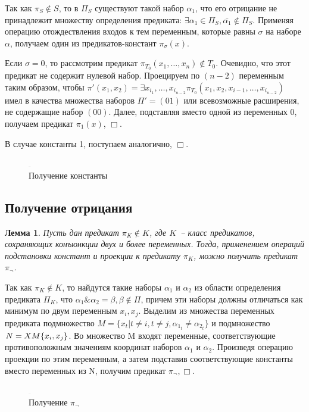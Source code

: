 \documentclass[12pt]{article}
\newtheorem{lemma}[theorem]{Лемма}
\newenvironment{proof}[1][Доказательство]{\begin{trivlist}
\item[\hskip \labelsep {\bfseries #1}]}{\end{trivlist}}
\begin{document}
\begin{proof}
Так как $\pi_S \notin S$, то в $\Pi_S$ существуют такой набор
$\alpha_1$, что его отрицание не принадлежит множеству определения предиката:
$\exists \alpha_1 \in \Pi_S, \bar{\alpha_1} \notin \Pi_S$.
Применяя операцию отождествления входов к тем переменным, которые равны $\sigma$ на наборе $\alpha$,
получаем один из предикатов-констант $\pi_{\sigma}(x)$.

Если $\sigma = 0$, то рассмотрим предикат 
$\pi_{T_0}(x_1, \dots, x_n) \notin T_0$. Очевидно, что этот предикат не содержит нулевой набор. 
Проецируем по $(n-2)$ переменным таким образом, чтобы 
$\pi'(x_1, x_2) = \exists {x_{i_1}, \dots, x_{i_{n-2}}} \pi_{T_0}(x_1, x_2, x_{i-1}, \dots, x_{i_{n-2}})$
имел в качества множества наборов $\Pi' = { (01) }$ или всевозможные расширения, не содержащие набор $(00)$.
Далее, подставляя вместо одной из переменных 0, получаем предикат $\pi_1(x)$, $\Box$. 

В случае константы 1, поступаем аналогично, $\Box$.
\end{proof}
\begin{figure}[htb]
\centering
\includegraphics[width=0.01\textwidth]{3_2to3.png}
\caption{Получение константы}
\label{fig:constant}
\end{figure}

\subsection{Получение отрицания}
\begin{lemma}
\label{eq:negate}
Пусть дан предикат $\pi_K \notin K$, где $K$~-- класс предикатов, сохраняющих конъюнкции двух и более переменных.
Тогда, применением операций подстановки констант и проекции
к предикату $\pi_K$, можно получить предикат $\pi_{\neg}$.
\end{lemma}

\begin{proof}
Так как $\pi_K \notin K$, то найдутся такие наборы $\alpha_1$ и $\alpha_2$ из области определения предиката $\Pi_K$, что
$\alpha_1\&\alpha_2=\beta, \beta \notin \Pi$, причем эти наборы должны отличаться как минимум по двум переменным $x_i, x_{j}$.
Выделим из множества переменных предиката подмножество $M = \{ x_t | t \neq i, t \neq j, \alpha_{1_t} \neq \alpha_{2_t} \}$ и 
подмножество $N = X \\ M \\ \{x_i, x_j\}$.
Во множество M входят переменные, соответствующие противоположным значениям координат наборов $\alpha_1$ и $\alpha_2$.
Произведя операцию проекции по этим переменным, а затем подставив соответствующие
константы вместо переменных из N, получим предикат $\pi_{\neg}, \Box$.
\begin{figure}[htb]
\centering
\includegraphics[width=0.01\textwidth]{3_2to3.png}
\caption{Получение $\pi_{\neg}$}
\label{fig:negation}
\end{figure}

\end{proof}
\end{document}
